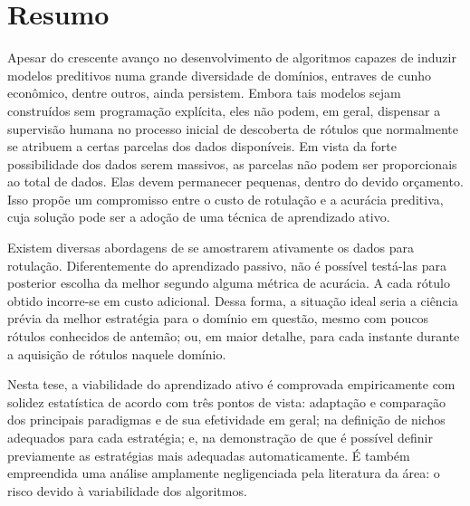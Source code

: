\chapter*{Resumo}








Apesar do crescente avanço no desenvolvimento de algoritmos capazes de induzir modelos preditivos
numa grande diversidade de domínios, entraves de cunho econômico, dentre outros, ainda persistem.
Embora tais modelos sejam construídos sem programação explícita,
eles não podem, em geral, dispensar a supervisão humana no processo inicial de descoberta de rótulos que
normalmente se atribuem a certas parcelas dos dados disponíveis.
Em vista da forte possibilidade dos dados serem massivos,
as parcelas não podem ser proporcionais ao total de dados.
Elas devem permanecer pequenas, dentro do devido orçamento.
Isso propõe um compromisso entre o custo de rotulação e a acurácia preditiva,
cuja solução pode ser a adoção de uma técnica de aprendizado ativo.

Existem diversas abordagens de se amostrarem ativamente os dados para rotulação.
Diferentemente do aprendizado passivo, não é possível testá-las para posterior escolha da melhor
segundo alguma métrica de acurácia.
A cada rótulo obtido incorre-se em custo adicional.
Dessa forma, a situação ideal seria a ciência prévia da melhor estratégia
para o domínio em questão, mesmo com poucos rótulos conhecidos de antemão;
ou, em maior detalhe,
para cada instante durante a aquisição de rótulos naquele domínio.

Nesta tese, a viabilidade do aprendizado ativo é comprovada empiricamente com
solidez estatística 
de acordo com três pontos de vista: adaptação e comparação dos principais
paradigmas e de sua efetividade em geral;
na definição de nichos adequados para cada estratégia;
e, na demonstração de que é possível definir previamente as estratégias mais
adequadas automaticamente. 
É também empreendida uma análise amplamente negligenciada pela
literatura da área:
o risco devido à variabilidade dos algoritmos.


\newpage
\thispagestyle{empty}
\mbox{}